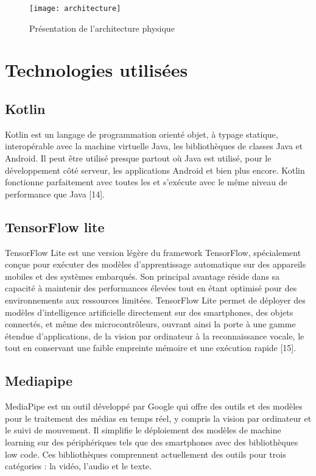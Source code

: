 \begin{figure}[H]
	\centering
	\texttt{[image: architecture]}
	\caption{Présentation de l'architecture physique}
\end{figure}

\section{Technologies utilisées}
\subsection{Kotlin}
Kotlin est un langage de programmation orienté objet, à typage statique, interopérable avec la machine virtuelle Java, les bibliothèques de classes Java et Android.
Il peut être utilisé presque partout où Java est utilisé, pour le développement côté serveur, les applications Android et bien plus encore. Kotlin fonctionne parfaitement avec toutes les et s'exécute avec le même niveau de performance que Java [14].

\subsection{TensorFlow lite}
TensorFlow Lite est une version légère du framework TensorFlow, spécialement conçue pour exécuter des modèles d'apprentissage automatique sur des appareils mobiles et des systèmes embarqués. Son principal avantage réside dans sa capacité à maintenir des performances élevées tout en étant optimisé pour des environnements aux ressources limitées. TensorFlow Lite  permet de déployer des modèles d'intelligence artificielle directement sur des smartphones, des objets connectés, et même des microcontrôleurs, ouvrant ainsi la porte à une gamme étendue d'applications, de la vision par ordinateur à la reconnaissance vocale, le tout en conservant une faible empreinte mémoire et une exécution rapide [15].

\subsection{Mediapipe}
MediaPipe est un outil développé par Google qui offre des outils et des modèles pour le traitement des médias en temps réel, y compris la vision par ordinateur et le suivi de mouvement. Il simplifie le déploiement des modèles de machine learning sur des périphériques tels que des smartphones avec des bibliothèques low code. Ces bibliothèques comprennent actuellement des outils pour trois catégories : la vidéo, l'audio et le texte.

